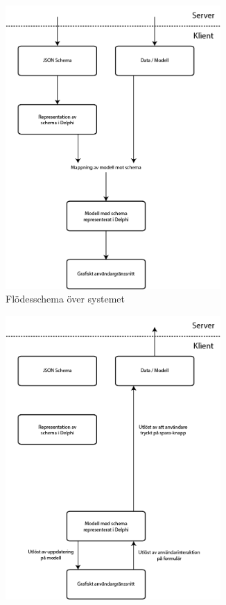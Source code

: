 \begin{figure}
	\begin{subfigure}{0.5\textwidth}
		\includegraphics[width=0.9\textwidth,left]{./images/system-flow/down.png}
		\caption{Flödesschema över systemet}
		\label{fig:system:ner}
	\end{subfigure}
	\begin{subfigure}{0.5\textwidth}
		\includegraphics[width=0.9\textwidth,right]{./images/system-flow/up.png}

\end{subfigure}
\end{figure}
